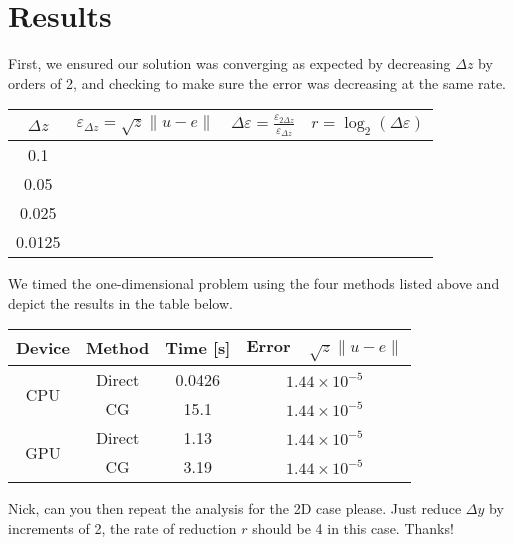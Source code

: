 \documentclass[11pt]{article}
\begin{document}
	\section{Results}
	First, we ensured our solution was converging as expected by decreasing $ \Delta z $ by orders of 2, and checking to make sure the error was decreasing at the same rate.
	\begin{center}
		\renewcommand{\arraystretch}{2.0}
		\begin{tabular}{c|c|c|c}
			\hline\hline
			$\displaystyle \Delta z $&$\displaystyle \varepsilon_{\Delta z} = \sqrt{z}\lVert u-e\rVert $&$ \displaystyle \Delta\varepsilon = \frac{\varepsilon_{2\Delta z}}{\varepsilon_{\Delta z}} $&$\displaystyle r = \log_2\left(\Delta\varepsilon\right) $\\
			\hline
			0.1&&&\\
			0.05&&&\\
			0.025&&&\\
			0.0125&&&\\
			\hline
		\end{tabular}
	\end{center}
	We timed the one-dimensional problem using the four methods listed above and depict the results in the table below.
	\begin{center}
		\renewcommand{\arraystretch}{1.5}
		\begin{tabular}{c|c|c|c}
			\hline\hline
			\textbf{Device}&\textbf{Method}&\textbf{Time [s]}&\textbf{Error~~$\sqrt{z}\lVert u-e\rVert $}\\
			\hline
			\multirow{2}{*}{CPU}&Direct&0.0426&$1.44\times 10^{-5}$\\
			&CG&15.1&$1.44\times 10^{-5}$\\
			\hline
			\multirow{2}{*}{GPU}&Direct&1.13&$1.44\times 10^{-5}$\\
			&CG&3.19&$1.44\times 10^{-5}$\\
			\hline
		\end{tabular}
	\end{center}
	Nick, can you then repeat the analysis for the 2D case please. Just reduce $ \Delta y $ by increments of 2, the rate of reduction $ r $ should be 4 in this case. Thanks!
\end{document}
